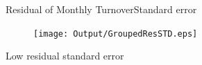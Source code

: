 \documentclass[handout]{beamer}
\begin{document}
\begin{frame}{Residual of Monthly Turnover}{Standard error}
	\begin{table}[htbp]
		\centering
		\resizebox{0.8\textwidth}{!}{
			
		}
		\label{tab:ResidualTrunStdSummary}
	\end{table}
\begin{figure}[htbp]
	\centering
	\texttt{[image: Output/GroupedResSTD.eps]}
	\label{fig:GroupedResSTD}
\end{figure}
\end{frame}

\begin{frame}{Low residual standard error}
	\begin{table}[htbp]
\centering
		\resizebox{0.8\textwidth}{!}{
			\centering
			
		}
		\label{Turnovercrosssection}
	\end{table}
\end{frame}

%			
%
%			
%
\end{document}
